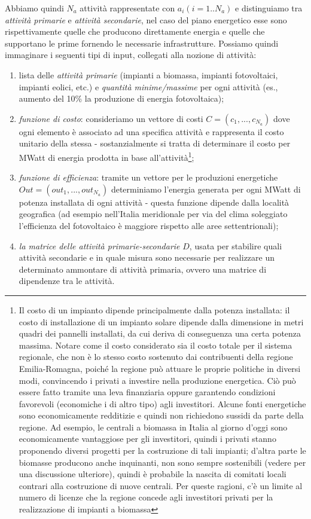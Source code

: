 Abbiamo quindi $N_a$ attività rappresentate con $a_i (i=1..N_a)$ e distinguiamo tra \emph{attività primarie} e \emph{attività secondarie}, nel caso del piano energetico esse sono rispettivamente quelle che producono direttamente energia e quelle che supportano le prime fornendo le necessarie infrastrutture. Possiamo quindi immaginare i seguenti tipi di input, collegati alla nozione di attività:
\begin{enumerate}
\item lista delle \emph{attività primarie} (impianti a biomassa, impianti fotovoltaici, impianti eolici, etc.) e \emph{quantità minime/massime} per ogni attività (es., aumento del 10\% la produzione di energia fotovoltaica);
\item \emph{funzione di costo}: consideriamo un vettore di costi $C=(c_1,...,c_{N_a})$ dove ogni elemento è associato ad una specifica attività e rappresenta il costo unitario della stessa - sostanzialmente si tratta di determinare il costo per MWatt di energia prodotta in base all'attività\footnote{Il costo di un impianto dipende principalmente dalla potenza installata: il costo di installazione di un impianto solare dipende dalla dimensione in metri quadri dei pannelli installati, da cui deriva di conseguenza una certa potenza massima. Notare come il costo considerato sia il costo totale per il sistema regionale, che non è lo stesso costo sostenuto dai contribuenti della regione Emilia-Romagna, poiché la regione può attuare le proprie politiche in diversi modi, convincendo i privati a investire nella produzione energetica. Ciò può essere fatto tramite una leva finanziaria oppure garantendo condizioni favorevoli (economiche i di altro tipo) agli investitori. Alcune fonti energetiche sono economicamente redditizie e quindi non richiedono sussidi da parte della regione. Ad esempio, le centrali a biomassa in Italia al giorno d'oggi sono economicamente vantaggiose per gli investitori, quindi i privati stanno proponendo diversi progetti per la costruzione di tali impianti; d'altra parte le biomasse producono anche inquinanti, non sono sempre sostenibili (vedere \cite{Cattafi} per una discussione ulteriore), quindi è probabile la nascita di comitati locali contrari alla costruzione di nuove centrali. Per queste ragioni, c'è un limite al numero di licenze che la regione concede agli investitori privati per la realizzazione di impianti a biomassa};
\item \emph{funzione di efficienza}: tramite un vettore per le produzioni energetiche $Out=(out_1,...,out_{N_a})$ determiniamo l'energia generata per ogni MWatt di potenza installata di ogni attività - questa funzione dipende dalla località geografica (ad esempio nell'Italia meridionale per via del clima soleggiato l'efficienza del fotovoltaico è maggiore rispetto alle aree settentrionali); 
\item \emph{la matrice delle attività primarie-secondarie} $D$, usata per stabilire quali attività secondarie e in quale misura sono necessarie per realizzare un determinato ammontare di attività primaria, ovvero una matrice di dipendenze tra le attività. 
\end{enumerate}
